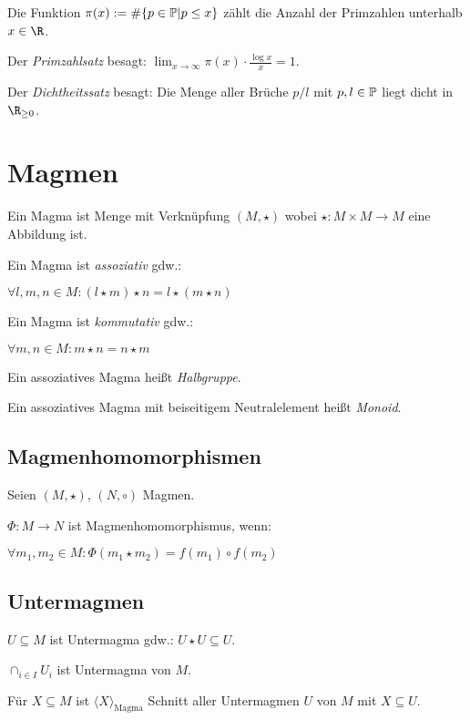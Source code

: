 Die Funktion $\pi(x) := \#\{ p \in \mathbb{P} | p \leq x \}$ zählt die Anzahl der Primzahlen unterhalb $x \in \R$.

Der \emph{Primzahlsatz} besagt: $\lim_{x \to \infty} \pi(x) \cdot \frac{\log{x}}{x} = 1$.

Der \emph{Dichtheitssatz} besagt: Die Menge aller Brüche $p/l$ mit $p, l \in \mathbb{P}$ liegt dicht in $\R_{\geq 0}$.

\section*{Magmen}

Ein Magma ist Menge mit Verknüpfung $(M, \star)$ wobei $\star : M \times M \to M$ eine Abbildung ist.

\vspace*{2mm}

Ein Magma ist \emph{assoziativ} gdw.:

$\forall l, m, n \in M : ( l \star m ) \star n = l \star ( m \star n )$

Ein Magma ist \emph{kommutativ} gdw.:

$\forall m, n \in M : m \star n = n \star m$

Ein assoziatives Magma heißt \emph{Halbgruppe}.

Ein assoziatives Magma mit beiseitigem Neutralelement heißt \emph{Monoid}.

\subsection*{Magmenhomomorphismen}

Seien $(M,\star)$, $(N,\circ)$ Magmen.

$\Phi : M \rightarrow N$ ist Magmenhomomorphismus, wenn:

$\forall m_1, m_2 \in M : \Phi(m_1 \star m_2) = f(m_1) \circ f(m_2)$

\subsection*{Untermagmen}

$U \subseteq M$ ist Untermagma gdw.: $U \star U \subseteq U$.

\vspace*{2mm}

$\cap_{i \in I} U_i$ ist Untermagma von $M$.

Für $X \subseteq M$ ist $\langle X \rangle_{\text{Magma}}$ Schnitt aller Untermagmen $U$ von $M$ mit $X \subseteq U$.

